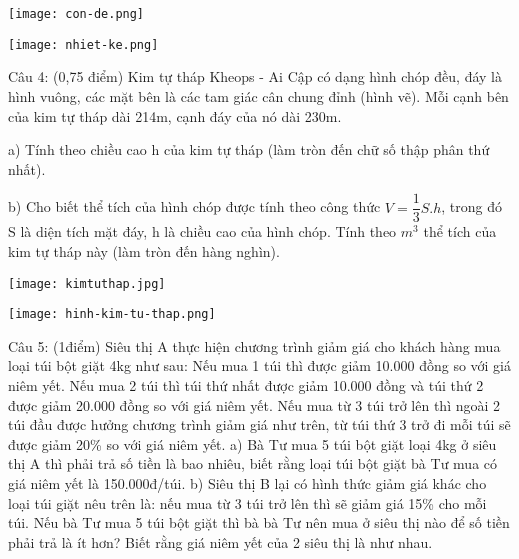 \documentclass[12pt]{article}
\begin{document}
\begin{multicols}{2}
\begin{center}
	\texttt{[image: con-de.png]}
\end{center} 
\columnbreak
\begin{center}
	\texttt{[image: nhiet-ke.png]}
\end{center} 
\end{multicols}

\newline Câu 4: (0,75 điểm) Kim tự tháp Kheops - Ai Cập có dạng hình chóp đều, đáy là hình vuông, các mặt bên là các tam giác cân chung đỉnh (hình vẽ). Mỗi cạnh bên của kim tự tháp dài 214m, cạnh đáy của nó dài 230m.

\newline a) Tính theo chiều cao h của kim tự tháp (làm tròn đến chữ số thập phân thứ nhất).

\newline b) Cho biết thể tích của hình chóp được tính theo công thức $V = \dfrac{1}{3}S.h$, trong đó S là diện tích mặt đáy, h là chiều cao của hình chóp. Tính theo $m^3$ thể tích của kim tự tháp này (làm tròn đến hàng nghìn).

\begin{multicols}{2}
\begin{center}
	\texttt{[image: kimtuthap.jpg]}
\end{center} 
\columnbreak
\begin{center}
	\texttt{[image: hinh-kim-tu-thap.png]}
\end{center} 
\end{multicols}

\newline Câu 5: (1điểm) Siêu thị A thực hiện chương trình giảm giá cho khách hàng mua loại túi bột giặt 4kg như sau: Nếu mua 1 túi thì được giảm 10.000 đồng so với giá niêm yết. Nếu mua 2 túi thì túi thứ nhất được giảm 10.000 đồng và túi thứ 2 được giảm 20.000 đồng so với giá niêm yết. Nếu mua từ 3 túi trở lên thì ngoài 2 túi đầu được hưởng chương trình giảm giá như trên, từ túi thứ 3 trở đi mỗi túi sẽ được giảm 20\% so với giá niêm yết.
\newline a) Bà Tư mua 5 túi bột giặt loại 4kg ở siêu thị A thì phải trả số tiền là bao nhiêu, biết rằng loại túi bột giặt bà Tư mua có giá niêm yết là 150.000đ/túi.
\newline b) Siêu thị B lại có hình thức giảm giá khác cho loại túi giặt nêu trên là: nếu mua từ 3 túi trở lên thì sẽ giảm giá 15\% cho mỗi túi. Nếu bà Tư mua 5 túi bột giặt thì bà bà Tư nên mua ở siêu thị nào để số tiền phải trả là ít hơn? Biết rằng giá niêm yết của 2 siêu thị là như nhau.
\end{document}
